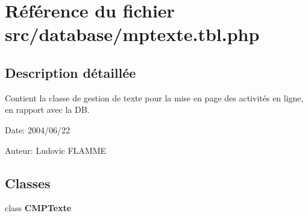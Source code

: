 \section{Référence du fichier src/database/mptexte.tbl.php}
\label{mptexte_8tbl_8php}


\subsection{Description détaillée}
Contient la classe de gestion de texte pour la mise en page des activités en ligne, en rapport avec la DB. 

\begin{Desc}
\item[Date:]2004/06/22\end{Desc}
\begin{Desc}
\item[Auteur:]Ludovic FLAMME \end{Desc}


\subsection*{Classes}
\begin{CompactItemize}
\item 
class \textbf{CMPTexte}
\end{CompactItemize}
